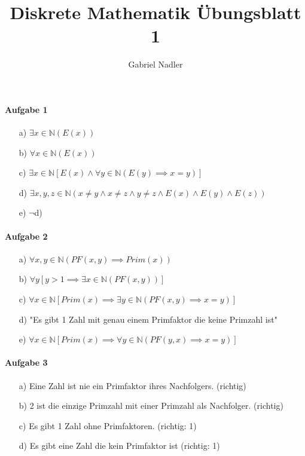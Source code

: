 \documentclass[10pt,a4paper]{article}
\author{Gabriel Nadler}
\title{Diskrete Mathematik Übungsblatt 1}
\begin{document}
	\maketitle
	\paragraph{Aufgabe 1}
\begin{itemize}
	\item[a)]$\exists x \in\mathbb{N} \left(E(x)\right)$
	
	\item[b)] $\forall x \in\mathbb{N} \left(E(x)\right)$
	
	\item[c)] $\exists x \in\mathbb{N} \left[E(x) \land \forall y \in \mathbb{N} \left(E(y) \implies x = y \right) \right]$
	
	\item[d)] $\exists x,y,z \in \mathbb{N} \left(x \neq y \land x \neq z \land y \neq z \land E(x) \land E(y) \land E(z)\right)$
	
	\item[e)] $\neg$d)
\end{itemize}
\paragraph{Aufgabe 2}
\begin{itemize}
	\item[a)] $\forall x,y \in \mathbb{N} \left(PF(x,y) \implies Prim(x)\right)$
	
	\item[b)] $\forall y\left[y > 1 \implies \exists x \in \mathbb{N} \left(PF(x,y)\right)\right]$
	
	\item[c)] $\forall x \in \mathbb{N} \left[Prim(x) \implies \exists y \in \mathbb{N} \left(PF(x,y) \implies x = y \right)\right]$
	
	\item[d)] "Es gibt 1 Zahl mit genau einem Primfaktor die keine Primzahl ist"
	
	\item[e)] $\forall x \in \mathbb{N} \left[Prim(x) \implies \forall y \in \mathbb{N} \left(PF(y,x) \implies x = y \right)\right]$
\end{itemize}
\paragraph{Aufgabe 3}
\begin{itemize}
	\item[a)] Eine Zahl ist nie ein Primfaktor ihres Nachfolgers. (richtig)
	\item[b)] 2 ist die einzige Primzahl mit einer Primzahl als Nachfolger. (richtig)
	\item[c)] Es gibt 1 Zahl ohne Primfaktoren. (richtig: 1)
	\item[d)] Es gibt eine Zahl die kein Primfaktor ist (richtig: 1)

\end{itemize}
\end{document}

